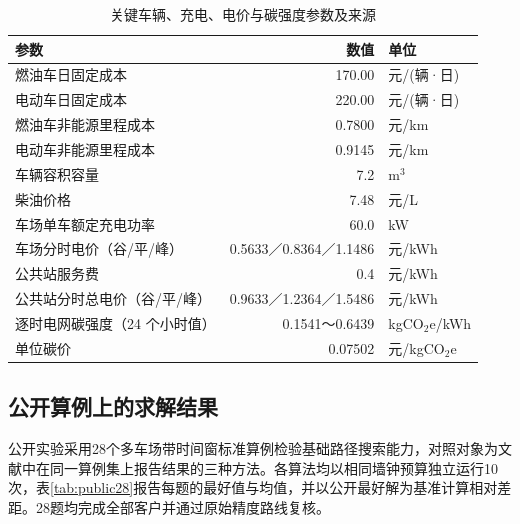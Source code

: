 \documentclass{setp-new}
\begin{document}
\begin{table}[htbp]
  \centering
  \caption{关键车辆、充电、电价与碳强度参数及来源}
  \label{tab:parameters}
  \scriptsize
  \begin{tabular}{lrl}
    \toprule
    参数 & 数值 & 单位\\
    \midrule
    燃油车日固定成本 & 170.00 & 元/(辆·日)\\
    电动车日固定成本 & 220.00 & 元/(辆·日)\\
    燃油车非能源里程成本 & 0.7800 & 元/km\\
    电动车非能源里程成本 & 0.9145 & 元/km\\
    车辆容积容量 & 7.2 & m$^3$\\
    柴油价格 & 7.48 & 元/L\\
    车场单车额定充电功率 & 60.0 & kW\\
    车场分时电价（谷/平/峰） & 0.5633／0.8364／1.1486 & 元/kWh\\
    公共站服务费 & 0.4 & 元/kWh\\
    公共站分时总电价（谷/平/峰） & 0.9633／1.2364／1.5486 & 元/kWh\\
    逐时电网碳强度（24 个小时值） & 0.1541～0.6439 & kgCO$_2$e/kWh\\
    单位碳价 & 0.07502 & 元/kgCO$_2$e\\
    \bottomrule
  \end{tabular}
\end{table}

\subsection{公开算例上的求解结果}

公开实验采用28个多车场带时间窗标准算例检验基础路径搜索能力，对照对象为文献中在同一算例集上报告结果的三种方法。各算法均以相同墙钟预算独立运行10次，表\ref{tab:public28}报告每题的最好值与均值，并以公开最好解为基准计算相对差距。28题均完成全部客户并通过原始精度路线复核。
\end{document}
